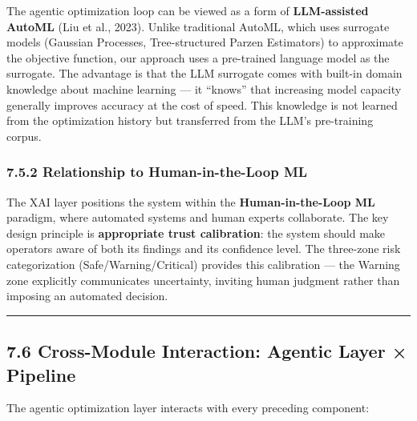 The agentic optimization loop can be viewed as a form of \textbf{LLM-assisted AutoML} (Liu et al., 2023). Unlike traditional AutoML, which uses surrogate models (Gaussian Processes, Tree-structured Parzen Estimators) to approximate the objective function, our approach uses a pre-trained language model as the surrogate. The advantage is that the LLM surrogate comes with built-in domain knowledge about machine learning --- it ``knows'' that increasing model capacity generally improves accuracy at the cost of speed. This knowledge is not learned from the optimization history but transferred from the LLM's pre-training corpus.

\subsubsection{7.5.2 Relationship to Human-in-the-Loop ML}\label{relationship-to-human-in-the-loop-ml}

The XAI layer positions the system within the \textbf{Human-in-the-Loop ML} paradigm, where automated systems and human experts collaborate. The key design principle is \textbf{appropriate trust calibration}: the system should make operators aware of both its findings and its confidence level. The three-zone risk categorization (Safe/Warning/Critical) provides this calibration --- the Warning zone explicitly communicates uncertainty, inviting human judgment rather than imposing an automated decision.

\begin{center}\rule{0.5\linewidth}{0.5pt}\end{center}

\subsection{7.6 Cross-Module Interaction: Agentic Layer × Pipeline}\label{cross-module-interaction-agentic-layer-pipeline}

The agentic optimization layer interacts with every preceding component:

